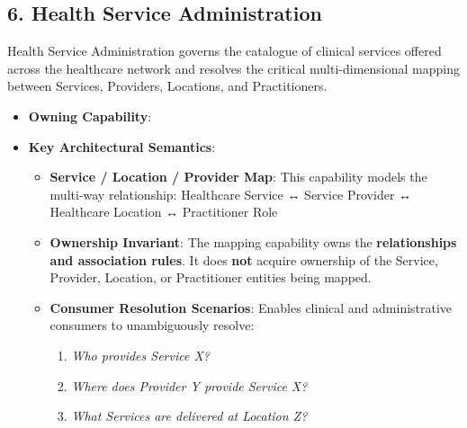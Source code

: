 \par\smallskip
{}\label{rad:em:157}
\subsection*{6. Health Service Administration}
\label{rad:em:159}

Health Service Administration governs the catalogue of clinical services offered across the healthcare network and resolves the critical multi-dimensional mapping between Services, Providers, Locations, and Practitioners.

\label{rad:em:161}

\begin{itemize}

\item 
\textbf{Owning Capability}: \texttt{}



\item 
\textbf{Key Architectural Semantics}:


\begin{itemize}

\item 
\textbf{Service /\allowbreak{} Location /\allowbreak{} Provider Map}: This capability models the multi-way relationship: Healthcare Service ↔ Service Provider ↔ Healthcare Location ↔ Practitioner Role



\item 
\textbf{Ownership Invariant}: The mapping capability owns the \textbf{relationships and association rules}. It does \textbf{not} acquire ownership of the Service, Provider, Location, or Practitioner entities being mapped.



\item 
\textbf{Consumer Resolution Scenarios}: Enables clinical and administrative consumers to unambiguously resolve:


\begin{enumerate}

\item 
\emph{Who provides Service X?}



\item 
\emph{Where does Provider Y provide Service X?}



\item 
\emph{What Services are delivered at Location Z?}




\end{enumerate}
\end{itemize}
\end{itemize}
